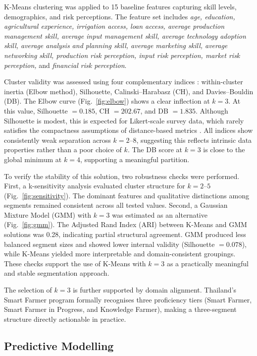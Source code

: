 \documentclass[3p,twocolumn,authoryear]{elsarticle}
\begin{document}
K-Means clustering \citep{macqueen1967} was applied to 15 baseline
features capturing skill levels, demographics, and risk perceptions.
The feature set includes \textit{age, education, agricultural experience,
irrigation access, loan access, average production management skill,
average input management skill, average technology adoption skill,
average analysis and planning skill, average marketing skill, average
networking skill, production risk perception, input risk perception,
market risk perception,} and \textit{financial risk perception}.

Cluster validity was assessed using four complementary indices
\citep{rouseeuw1987}: within-cluster inertia (Elbow method), Silhouette,
Calinski--Harabasz (CH), and Davies--Bouldin (DB).
The Elbow curve (Fig.~\ref{fig:elbow}) shows a clear inflection at
$k = 3$. At this value, Silhouette $= 0.185$, CH $= 202.67$, and
DB $= 1.835$.
Although Silhouette is modest, this is expected for Likert-scale survey
data, which rarely satisfies the compactness assumptions of
distance-based metrics \citep{rouseeuw1987}.
All indices show consistently weak separation across $k = 2$--$8$,
suggesting this reflects intrinsic data properties rather than a poor
choice of $k$.
The DB score at $k = 3$ is close to the global minimum at $k = 4$,
supporting a meaningful partition.

To verify the stability of this solution, two robustness checks were
performed.
First, a k-sensitivity analysis evaluated cluster structure for
$k = 2$--$5$ (Fig.~\ref{fig:sensitivity}).
The dominant features and qualitative distinctions among segments remained
consistent across all tested values.
Second, a Gaussian Mixture Model (GMM) with $k = 3$ was estimated as an
alternative (Fig.~\ref{fig:gmm}).
The Adjusted Rand Index (ARI) between K-Means and GMM solutions was 0.28,
indicating partial structural agreement.
GMM produced less balanced segment sizes and showed lower internal
validity (Silhouette $= 0.078$), while K-Means yielded more
interpretable and domain-consistent groupings.
These checks support the use of K-Means with $k = 3$ as a practically
meaningful and stable segmentation approach.

The selection of $k = 3$ is further supported by domain alignment.
Thailand's Smart Farmer program formally recognises three proficiency
tiers (Smart Farmer, Smart Farmer in Progress, and Knowledge Farmer),
making a three-segment structure directly actionable in practice.

\subsection{Predictive Modelling}
\end{document}
